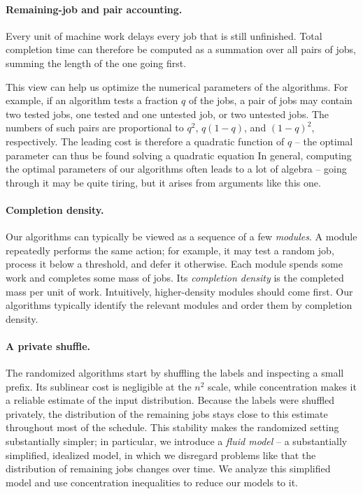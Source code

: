 \paragraph{Remaining-job and pair accounting.}
Every unit of machine work delays every job that is still unfinished. 
Total completion time can therefore be computed as a summation over all pairs of jobs, summing the length of the one going first. 

This view can help us optimize the numerical parameters of the algorithms. For example, if an algorithm tests a fraction $q$ of the jobs, a pair of jobs may contain two tested jobs, one tested and
one untested job, or two untested jobs.  The numbers of such pairs are
proportional to $q^2$, $q(1-q)$, and $(1-q)^2$, respectively. The leading cost is therefore a quadratic function of $q$ -- the optimal parameter can thus be found solving a quadratic equation In general, computing the optimal parameters of our algorithms often leads to a lot of algebra -- going through it may be quite tiring, but it arises from arguments like this one. 

\paragraph{Completion density.}
Our algorithms can typically be viewed as a sequence of a few
\emph{modules}.  A module repeatedly performs the same action;
for example, it may test a random job, process it below a threshold, and
defer it otherwise.  Each module spends some work and completes some mass of
jobs.  Its \emph{completion density} is the completed mass per unit of work.
Intuitively, higher-density modules should come first. Our
algorithms typically identify the relevant modules and order them by
completion density.

\paragraph{A private shuffle.}
The randomized algorithms start by shuffling the labels and inspecting a
small prefix.  Its sublinear cost is negligible at the $n^2$ scale, while
concentration makes it a reliable estimate of the input distribution.
Because the labels were shuffled privately, the distribution of the
remaining jobs stays close to this estimate throughout most of the schedule.
This stability makes the randomized setting substantially simpler; in particular, we introduce a \emph{fluid model} -- a substantially simplified, idealized model, in which we disregard problems like that the distribution of remaining jobs changes over time. We analyze this simplified model and use concentration inequalities to reduce our models to it. 

